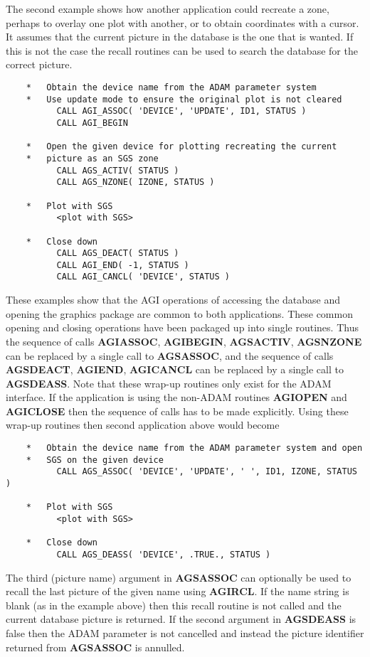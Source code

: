 \documentclass[twoside,11pt]{article}
\newcommand{\htmlref}[2]{#1}
\renewcommand{\_}{\texttt{\symbol{95}}}
\begin{document}
The second example shows how another application could recreate a zone,
perhaps to overlay one plot with another, or to obtain coordinates with
a cursor. It assumes that the current picture in the database is the one
that is wanted. If this is not the case the recall routines can be used
to search the database for the correct picture.
\begin{verbatim}
    *   Obtain the device name from the ADAM parameter system
    *   Use update mode to ensure the original plot is not cleared
          CALL AGI_ASSOC( 'DEVICE', 'UPDATE', ID1, STATUS )
          CALL AGI_BEGIN

    *   Open the given device for plotting recreating the current
    *   picture as an SGS zone
          CALL AGS_ACTIV( STATUS )
          CALL AGS_NZONE( IZONE, STATUS )

    *   Plot with SGS
          <plot with SGS>

    *   Close down
          CALL AGS_DEACT( STATUS )
          CALL AGI_END( -1, STATUS )
          CALL AGI_CANCL( 'DEVICE', STATUS )
\end{verbatim}

These examples show that the AGI operations of accessing the database and
opening the graphics package are common to both applications. These
common opening and closing operations have been packaged up into single
routines. Thus the sequence of calls {\bf AGI\_ASSOC}, {\bf AGI\_BEGIN},
{\bf AGS\_ACTIV}, {\bf AGS\_NZONE} can be replaced by a single call to
\htmlref{{\bf AGS\_ASSOC}}{AGS_ASSOC}, 
and the sequence of calls {\bf AGS\_DEACT},
{\bf AGI\_END}, {\bf AGI\_CANCL} can be replaced by a single call to
\htmlref{{\bf AGS\_DEASS}}{AGS_DEASS}. 
Note that these wrap-up routines only exist for the
ADAM interface. If the application is using the non-ADAM routines
{\bf AGI\_OPEN} and {\bf AGI\_CLOSE} then the sequence of calls has to
be made explicitly. Using these wrap-up routines then second application
above would become
\begin{verbatim}
    *   Obtain the device name from the ADAM parameter system and open
    *   SGS on the given device
          CALL AGS_ASSOC( 'DEVICE', 'UPDATE', ' ', ID1, IZONE, STATUS )

    *   Plot with SGS
          <plot with SGS>

    *   Close down
          CALL AGS_DEASS( 'DEVICE', .TRUE., STATUS )
\end{verbatim}
The third (picture name) argument in {\bf AGS\_ASSOC} can optionally be
used to recall the last picture of the given name using \htmlref{{\bf AGI\_RCL}}{AGI_RCL}.
If the name string is blank (as in the example above) then this recall
routine is not called and the current database picture is returned.
If the second argument in {\bf AGS\_DEASS} is false then the ADAM parameter
is not cancelled and instead the picture identifier returned from
{\bf AGS\_ASSOC} is annulled.
\end{document}
